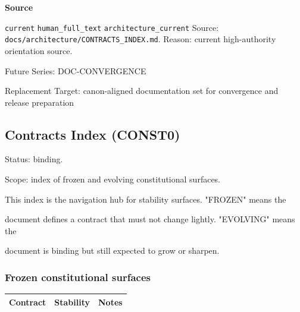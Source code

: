 \documentclass[9pt,a4paper,openany]{book}
\newcommand{\toprule}{\hline}
\newcommand{\midrule}{\hline}
\newcommand{\bottomrule}{\hline}
\newcommand{\vonecallout}[3]{\par\medskip\noindent\begingroup\setlength{\fboxsep}{7pt}\colorbox{DomCalloutBg}{\parbox{0.94\linewidth}{\textbf{\textcolor{#1}{#2}}\par #3}}\endgroup\par\medskip}
\begin{document}
\vonecallout{DomSlate}{Source}{\texttt{current} \texttt{human\_\allowbreak{}full\_\allowbreak{}text} \texttt{architecture\_\allowbreak{}current} Source: \texttt{docs/\allowbreak{}architecture/\allowbreak{}CONTRACTS\_\allowbreak{}INDEX.\allowbreak{}md}.\allowbreak{} Reason: current high-\allowbreak{}authority orientation source.\allowbreak{}}

Future Series: DOC-\allowbreak{}CONVERGENCE

Replacement Target: canon-\allowbreak{}aligned documentation set for convergence and release preparation


\subsection{Contracts Index (CONST0)}





Status: binding.\allowbreak{}



Scope: index of frozen and evolving constitutional surfaces.\allowbreak{}






This index is the navigation hub for stability surfaces.\allowbreak{} "FROZEN" means the



document defines a contract that must not change lightly.\allowbreak{} "EVOLVING" means the



document is binding but still expected to grow or sharpen.\allowbreak{}






\subsubsection{Frozen constitutional surfaces}


\begin{center}
{\small\renewcommand{\arraystretch}{1.18}
\begin{tabularx}{\linewidth}{@{}>{\raggedright\arraybackslash}X >{\raggedright\arraybackslash}X >{\raggedright\arraybackslash}X@{}}
\toprule
\textbf{Contract} & \textbf{Stability} & \textbf{Notes} \\
\midrule
\bottomrule
\end{tabularx}
}
\end{center}
\end{document}
